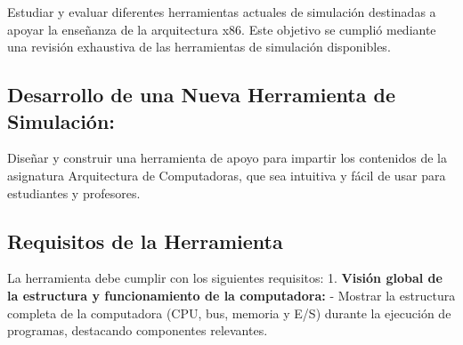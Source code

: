 \documentclass[12pt,twoside]{templates/unerthesis}
\begin{document}
Estudiar y evaluar diferentes herramientas actuales de simulación destinadas a apoyar la enseñanza de la arquitectura x86. Este objetivo se cumplió mediante una revisión exhaustiva de las herramientas de simulación disponibles.

\hypertarget{desarrollo-de-una-nueva-herramienta-de-simulaciuxf3n}{%
\subsection{Desarrollo de una Nueva Herramienta de Simulación:}\label{desarrollo-de-una-nueva-herramienta-de-simulaciuxf3n}}

Diseñar y construir una herramienta de apoyo para impartir los contenidos de la asignatura Arquitectura de Computadoras, que sea intuitiva y fácil de usar para estudiantes y profesores.

\hypertarget{requisitos-de-la-herramienta}{%
\subsection{Requisitos de la Herramienta}\label{requisitos-de-la-herramienta}}

La herramienta debe cumplir con los siguientes requisitos:
1. \textbf{Visión global de la estructura y funcionamiento de la computadora:}
- Mostrar la estructura completa de la computadora (CPU, bus, memoria y E/S) durante la ejecución de programas, destacando componentes relevantes.
\end{document}
